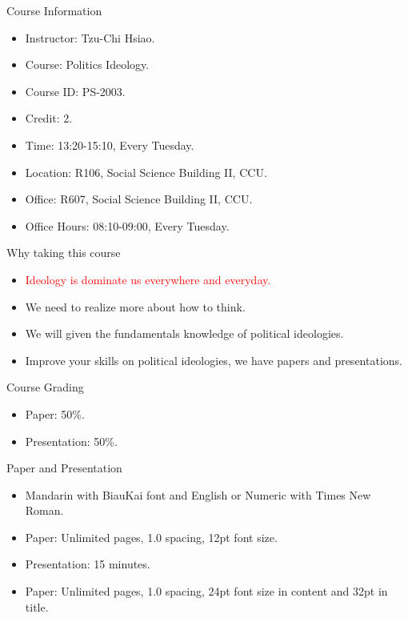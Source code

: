 \documentclass{beamer}
\begin{document}
\begin{frame}{Course Information}
\begin{itemize}
\pause
\item Instructor: Tzu-Chi Hsiao.
\pause
\item Course: Politics Ideology.
\pause
\item Course ID: PS-2003.
\pause
\item Credit: 2.
\pause
\item Time: 13:20-15:10, Every Tuesday.
\pause
\item Location: R106, Social Science Building II, CCU. 
\pause
\item Office: R607, Social Science Building II, CCU.
\pause
\item Office Hours: 08:10-09:00, Every Tuesday.
\end{itemize}
\end{frame}
\begin{frame}{Why taking this course}
\begin{itemize}
\pause
\item \textcolor{red}{Ideology is dominate us everywhere and everyday.}
\pause
\item We need to realize more about how to think.
\pause
\item We will given the fundamentals knowledge of political ideologies.
\pause
\item Improve your skills on political ideologies, we have papers and presentations.
\end{itemize}
\end{frame}
\begin{frame}{Course Grading}
\begin{itemize}
\pause
\item Paper: 50\%.
\vspace{1em}
\pause
\item Presentation: 50\%.
\end{itemize}
\end{frame}
\begin{frame}{Paper and Presentation}
\begin{itemize}
\pause
\item Mandarin with BiauKai font and English or Numeric with Times New Roman.
\pause
\item Paper: Unlimited pages, 1.0 spacing, 12pt font size.
\pause
\item Presentation: 15 minutes.
\pause
\item Paper: Unlimited pages, 1.0 spacing, 24pt font size in content and 32pt in title.
\end{itemize}
\end{frame}
\end{document}
